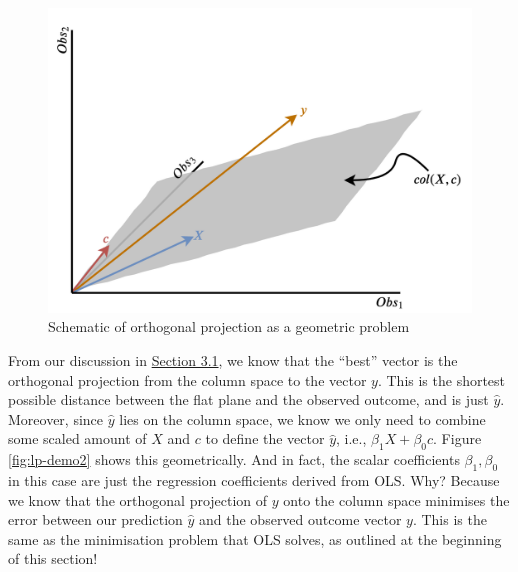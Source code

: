 \documentclass[
]{book}
\begin{document}
\begin{figure}
\includegraphics[width=1\linewidth]{images/lp_solve1} \caption{Schematic of orthogonal projection as a geometric problem}\label{fig:lp-demo1}
\end{figure}

From our discussion in \protect\hyperlink{proj_def}{Section 3.1}, we know that the ``best'' vector is the orthogonal projection from the column space to the vector \(y\). This is the shortest possible distance between the flat plane and the observed outcome, and is just \(\hat{y}\). Moreover, since \(\hat{y}\) lies on the column space, we know we only need to combine some scaled amount of \(X\) and \(c\) to define the vector \(\hat{y}\), i.e., \(\beta_1X + \beta_0c\). Figure \ref{fig:lp-demo2} shows this geometrically. And in fact, the scalar coefficients \(\beta_1, \beta_0\) in this case are just the regression coefficients derived from OLS. Why? Because we know that the orthogonal projection of \(y\) onto the column space minimises the error between our prediction \(\hat{y}\) and the observed outcome vector \(y\). This is the same as the minimisation problem that OLS solves, as outlined at the beginning of this section!
\end{document}
